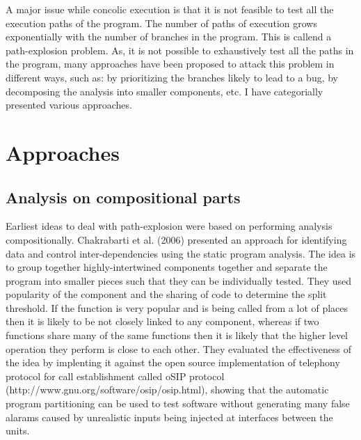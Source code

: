 \documentclass[	runningheads,
				a4paper]{llncs}
\begin{document}
A major issue while concolic execution is that it is not feasible to test all the execution paths of the program. The number of paths of execution grows exponentially with the number of branches in the program. This is callend a path-explosion problem. As, it is not possible to exhaustively test all the paths in the program, many approaches have been proposed to attack this problem in different ways, such as: by prioritizing the branches likely to lead to a bug, by decomposing the analysis into smaller components, etc. I have categorially presented various approaches.

\section{Approaches}

\subsection{Analysis on compositional parts}

Earliest ideas to deal with path-explosion were based on performing analysis compositionally.
Chakrabarti et al. (2006) \cite{chakrabarti2006software} presented an approach for identifying data and control inter-dependencies using the static program analysis. The idea is to group together highly-intertwined components together and separate the program into smaller pieces such that they can be individually tested. They used popularity of the component and the sharing of code to determine the split threshold. If the function is very popular and is being called from a lot of places then it is likely to be not closely linked to any component, whereas if two functions share many of the same functions then it is likely that the higher level operation they perform is close to each other. They evaluated the effectiveness of the idea by implenting it against the open source implementation of telephony protocol for call establishment called oSIP protocol (http://www.gnu.org/software/osip/osip.html), showing that the automatic program partitioning can be used to test software without generating many false alarams caused by unrealistic inputs being injected at interfaces between the units.
\end{document}
